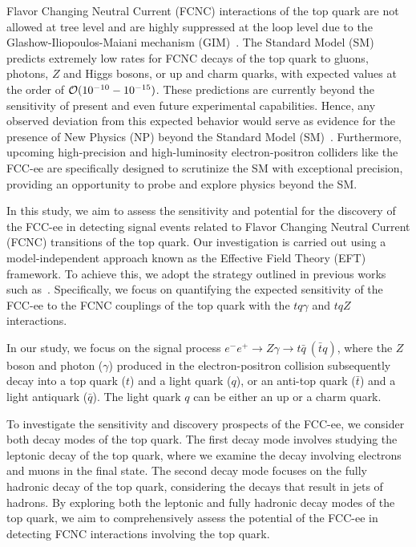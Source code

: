 \documentclass[11pt,onecolumn,english,showpacs,preprintnumbers,amsmath,amssymb,floatfix,nofootinbib]{revtex4-1}
\def\to{\rightarrow}
\begin{document}
Flavor Changing Neutral Current (FCNC) interactions of the top quark are not allowed 
at  tree level and are highly suppressed at the loop level 
due to the Glashow-Iliopoulos-Maiani mechanism (GIM)~\cite{Glashow:1970gm}. 
The Standard Model (SM) predicts extremely low rates for FCNC decays of the top 
quark to gluons, photons, $Z$ and Higgs bosons, or up and charm quarks, with expected 
values at the order of ${\cal{O}} (10^{-10}-10^{-15})$. These predictions are currently 
beyond the sensitivity of present and even future experimental capabilities.
Hence, any observed deviation from this expected behavior would serve as evidence for 
the presence of New Physics (NP) beyond the Standard Model (SM)~\cite{Aguilar-Saavedra:2004mfd}. 
Furthermore, upcoming high-precision and high-luminosity electron-positron colliders like 
the FCC-ee are specifically designed to scrutinize the SM with exceptional precision, 
providing an opportunity to probe and explore physics beyond the SM.

In this study, we aim to assess the sensitivity and potential for the discovery of 
the FCC-ee in detecting signal events related to Flavor Changing Neutral Current (FCNC) 
transitions of the top quark. Our investigation is carried out using a model-independent approach known as the Effective Field Theory (EFT) framework. 
To achieve this, we adopt the strategy outlined in previous works 
such as~\cite{Aguilar-Saavedra:2004mfd,Aguilar-Saavedra:2008nuh}. Specifically, 
we focus on quantifying the expected sensitivity of the FCC-ee to the FCNC couplings 
of the top quark with the $tq\gamma$ and $tqZ$ interactions.

In our study, we focus on the signal process $e^- e^+ \to Z \gamma \to t \bar{q} ~ (\bar{t} q)$, 
where the $Z$ boson and photon ($\gamma$) produced in the electron-positron collision 
subsequently decay into a top quark ($t$) and a light quark ($q$), or an 
anti-top quark ($\bar{t}$) and a light antiquark ($\bar{q}$). The light quark $q$ can be either an up or a charm quark.

To investigate the sensitivity and discovery prospects of the FCC-ee, 
we consider both decay modes of the top quark. 
The first decay mode involves studying the leptonic decay of the top quark, where we 
examine the decay involving electrons and muons in the final state. The second decay mode  
focuses on the fully hadronic decay of the top quark, considering the decays that result in 
jets of hadrons. By exploring both the leptonic and fully hadronic decay modes of the top 
quark, we aim to comprehensively assess the potential of the FCC-ee in 
detecting FCNC interactions involving the top quark.
\end{document}
